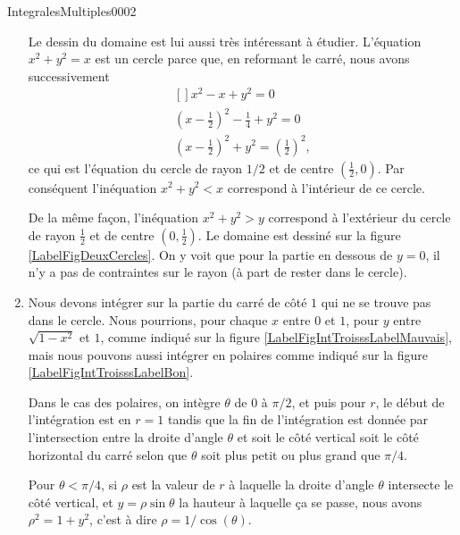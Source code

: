 \begin{corrige}{IntegralesMultiples0002}
\begin{enumerate}
			Le dessin du domaine est lui aussi très intéressant à étudier. L'équation $x^2+y^2=x$ est un cercle parce que, en reformant le carré, nous avons successivement
			\begin{equation}
				\begin{aligned}[]
					x^2-x+y^2=0\\
					\left( x-\frac{ 1 }{2} \right)^2-\frac{1}{ 4 }+y^2=0\\
					\left( x-\frac{ 1 }{2} \right)^2+y^2=\left( \frac{ 1 }{2} \right)^2,
				\end{aligned}
			\end{equation}
			ce qui est l'équation du cercle de rayon $1/2$ et de centre $(\frac{ 1 }{2},0)$. Par conséquent l'inéquation $x^2+y^2<x$ correspond à l'intérieur de ce cercle.

			\newcommand{\CaptionFigDeuxCercles}{Domaine d'intégration pour l'exercice \ref{exoIntegralesMultiples0002}.\ref{ItemexoIntegralesMultiples0002ii}.}
			

			De la même façon, l'inéquation $x^2+y^2>y$ correspond à l'extérieur du cercle de rayon $\frac{ 1 }{2}$ et de centre $(0,\frac{ 1 }{2})$. Le domaine est dessiné sur la figure \ref{LabelFigDeuxCercles}. On y voit que pour la partie en dessous de $y=0$, il n'y a pas de contraintes sur le rayon (à part de rester dans le cercle).

\newcommand{\CaptionFigIntTrois}{Domaine d'intégration pour l'exercice \ref{exoIntegralesMultiples0002}.\ref{ItemexoIntegralesMultiples0002iii}.}


		\item
			Nous devons intégrer sur la partie du carré de côté $1$ qui ne se trouve pas dans le cercle. Nous pourrions, pour chaque $x$ entre $0$ et $1$, pour $y$ entre $\sqrt{1-x^2}$ et $1$, comme indiqué sur la figure \ref{LabelFigIntTroisssLabelMauvais}, mais nous pouvons aussi intégrer en polaires comme indiqué sur la figure \ref{LabelFigIntTroisssLabelBon}.

			Dans le cas des polaires, on intègre $\theta$ de $0$ à $\pi/2$, et puis pour $r$, le début de l'intégration est en $r=1$ tandis que la fin de l'intégration est donnée par l'intersection entre la droite d'angle $\theta$ et soit le côté vertical soit le côté horizontal du carré selon que $\theta$ soit plus petit ou plus grand que $\pi/4$.

			Pour $\theta<\pi/4$, si $\rho$ est la valeur de $r$ à laquelle la droite d'angle $\theta$ intersecte le côté vertical, et $y=\rho\sin\theta$ la hauteur à laquelle ça se passe, nous avons $\rho^2=1+y^2$, c'est à dire $\rho=1/\cos(\theta)$.


\end{enumerate}
\end{corrige}
